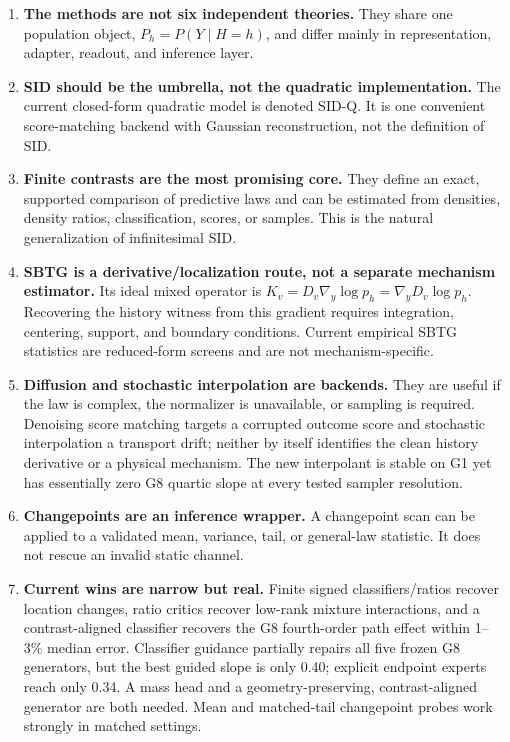 \documentclass[10pt]{article}
\newcommand{\SIDQ}{\textnormal{\textsc{SID-Q}}\xspace}
\begin{document}
\begin{enumerate}
  \item \textbf{The methods are not six independent theories.} They share one population object, \(P_h=P(Y\mid H=h)\), and differ mainly in representation, adapter, readout, and inference layer.
  \item \textbf{SID should be the umbrella, not the quadratic implementation.} The current closed-form quadratic model is denoted \SIDQ. It is one convenient score-matching backend with Gaussian reconstruction, not the definition of SID.
  \item \textbf{Finite contrasts are the most promising core.} They define an exact, supported comparison of predictive laws and can be estimated from densities, density ratios, classification, scores, or samples. This is the natural generalization of infinitesimal SID.
  \item \textbf{SBTG is a derivative/localization route, not a separate mechanism estimator.} Its ideal mixed operator is \(K_v=D_v\nabla_y\log p_h=\nabla_y D_v\log p_h\). Recovering the history witness from this gradient requires integration, centering, support, and boundary conditions. Current empirical SBTG statistics are reduced-form screens and are not mechanism-specific.
  \item \textbf{Diffusion and stochastic interpolation are backends.} They are useful if the law is complex, the normalizer is unavailable, or sampling is required. Denoising score matching targets a corrupted outcome score and stochastic interpolation a transport drift; neither by itself identifies the clean history derivative or a physical mechanism.  The new interpolant is stable on G1 yet has essentially zero G8 quartic slope at every tested sampler resolution.
  \item \textbf{Changepoints are an inference wrapper.} A changepoint scan can be applied to a validated mean, variance, tail, or general-law statistic. It does not rescue an invalid static channel.
  \item \textbf{Current wins are narrow but real.} Finite signed classifiers/ratios recover location changes, ratio critics recover low-rank mixture interactions, and a contrast-aligned classifier recovers the G8 fourth-order path effect within 1--3\% median error.  Classifier guidance partially repairs all five frozen G8 generators, but the best guided slope is only 0.40; explicit endpoint experts reach only 0.34.  A mass head and a geometry-preserving, contrast-aligned generator are both needed. Mean and matched-tail changepoint probes work strongly in matched settings.

\end{enumerate}
\end{document}
